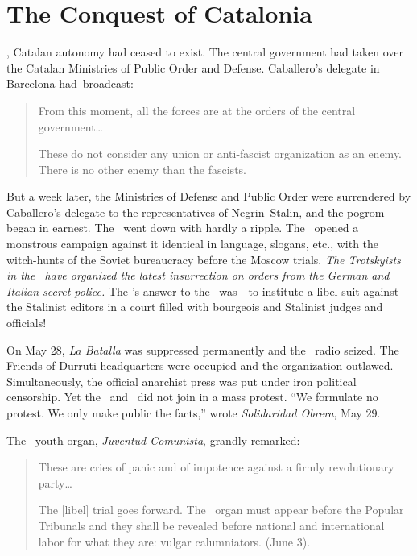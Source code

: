 \chapter{The Conquest of Catalonia}

, Catalan autonomy had ceased to exist. The central government had taken over the Catalan Ministries of Public Order and Defense. Caballero’s{\indexLCaballero} delegate in Barcelona had~broadcast:

\begin{quotation}
  From this moment, all the forces are at the orders of the central government\dots
  
  These do not consider any union or anti-fascist organization as an enemy. There is no other enemy than the fascists.
\end{quotation}

But a week later, the Ministries of Defense and Public Order were surrendered by Caballero’s delegate to the representatives of Negrin--Stalin, and the pogrom began in earnest. The \POUM\indexPOUM\ went down with hardly a ripple. The \PSUC\ opened a monstrous campaign against it identical in language, slogans, etc., with the witch-hunts of the Soviet bureaucracy before the Moscow trials. \emph{The Trotskyists in the \POUM\ have organized the latest insurrection on orders from the German and Italian secret police.} The \POUM’s answer to the \PSUC\ was---to institute a libel suit against the Stalinist editors in a court filled with bourgeois and Stalinist judges and officials!

On May 28, \emph{La Batalla} was suppressed permanently and the \POUM\ radio seized. The Friends of Durruti headquarters were occupied and the organization outlawed. Simultaneously, the official anarchist press was put under iron political censorship. Yet the \POUM\ and \CNT\ did not join in a mass protest. ``We formulate no protest. We only make public the facts,'' wrote \emph{Solidaridad Obrera}, May 29.

\newpage

The \POUM\ youth organ, \emph{Juventud Comunista}, grandly remarked:

\begin{quotation}
  These are cries of panic and of impotence against a firmly revolutionary party\dots
  
  The [libel] trial goes forward. The \PSUC\ organ must appear before the Popular Tribunals and they shall be revealed before national and international labor for what they are: vulgar calumniators. (June 3).
\end{quotation}
  
